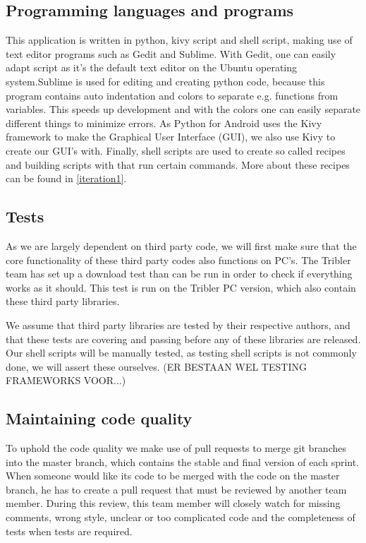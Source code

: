 \subsection{Programming languages and programs}
\label{programminglang}
This application is written in python, kivy script and shell script, making use of text editor programs such as Gedit and Sublime. With Gedit, one can easily adapt script as it's the default text editor on the Ubuntu operating system.Sublime is used for editing and creating python code, because this program contains auto indentation and colors to separate e.g. functions from variables. This speeds up development and with the colors one can easily separate different things to minimize errors.
As Python for Android uses the Kivy framework to make the Graphical User Interface (GUI), we also use Kivy to create our GUI's with.
Finally, shell scripts are used to create so called recipes and building scripts with that run certain commands. More about these recipes can be found in \ref{iteration1}.

\subsection{Tests}
As we are largely dependent on third party code, we will first make sure that the core functionality of these third party codes also functions on PC's. The Tribler team has set up a download test than can be run in order to check if everything works as it should. This test is run on the Tribler PC version, which also contain these third party libraries.

We assume that third party libraries are tested by their respective authors, and that these tests are covering and passing before any of these libraries are released.
Our shell scripts will be manually tested, as testing shell scripts is not commonly done, we will assert these ourselves.
(ER BESTAAN WEL TESTING FRAMEWORKS VOOR...)

\subsection{Maintaining code quality}
\label{codeQuality}
To uphold the code quality we make use of pull requests to merge git branches into the master branch, which contains the stable and final version of each sprint. When someone would like its code to be merged with the code on the master branch, he has to create a pull request that must be reviewed by another team member. During this review, this team member will closely watch for missing comments, wrong style, unclear or too complicated code and the completeness of tests when tests are required.

